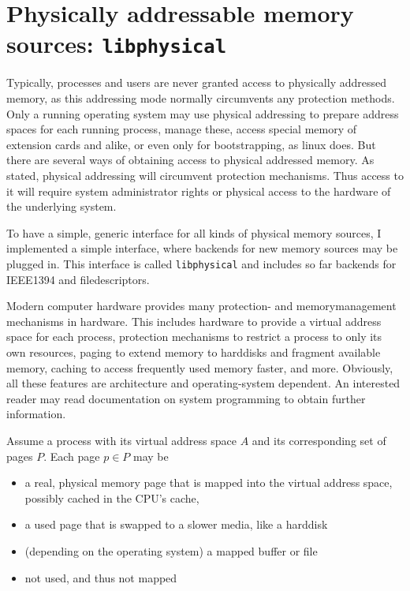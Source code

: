 %
%

\section{Physically addressable memory sources: \texttt{libphysical}}

Typically, processes and users are never granted access to physically addressed
memory, as this addressing mode normally circumvents any protection methods.
Only a running operating system may use physical addressing to prepare address
spaces for each running process, manage these, access special memory of
extension cards and alike, or even only for bootstrapping, as linux does. But
there are several ways of obtaining access to physical addressed memory. As
stated, physical addressing will circumvent protection mechanisms. Thus access
to it will require system administrator rights or physical access to the
hardware of the underlying system.

To have a simple, generic interface for all kinds of physical memory sources, I
implemented a simple interface, where backends for new memory sources may be
plugged in. This interface is called \texttt{libphysical} and includes so far
backends for IEEE1394 and filedescriptors.

Modern computer hardware provides many protection- and memorymanagement
mechanisms in hardware. This includes hardware to provide a virtual address
space for each process, protection mechanisms to restrict a process to only its
own resources, paging to extend memory to harddisks and fragment available
memory, caching to access frequently used memory faster, and more. Obviously,
all these features are architecture and operating-system dependent. An
interested reader may read documentation on system programming to obtain further
information.

Assume a process with its virtual address space $A$ and its corresponding set of
pages $P$. Each page $p \in P$ may be

\begin{itemize}

	\item a real, physical memory page that is mapped into the virtual 
		address space, possibly cached in the CPU's cache,

	\item a used page that is swapped to a slower media, like a harddisk

	\item (depending on the operating system) a mapped buffer or file

	\item not used, and thus not mapped

\end{itemize}

